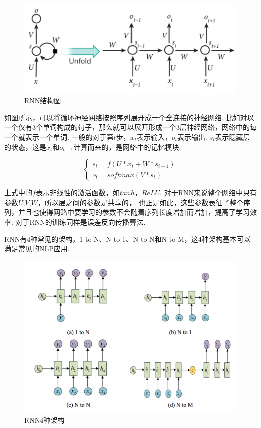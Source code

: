 \documentclass[bachelor,adobefonts]{jnuthesis}
\begin{document}
\begin{figure}[h!]
  \centering
  \includegraphics[width=0.6\linewidth]{RNN.png}
  \caption{RNN结构图}
\end{figure}

如图所示，可以将循环神经网络按照序列展开成一个全连接的神经网络.
比如对以一个仅有3个单词构成的句子，那么就可以展开形成一个3层神经网络，网络中的每一个就表示一个单词.
一般的对于第$t$步，$x_{t}$表示输入，$o_{t}$表示输出.
$s_{t}$表示隐藏层的状态，这是$x_{t}$和$o_{t-1}$计算而来的，是网络中的记忆模块.

\begin{equation}
  \left\{
  \begin{array}{l}
    s_{t} = f(U*x_{t}+W*s_{t-1}) \\
    o_{t} = softmax(V*s_{t})
  \end{array}
  \right.
\end{equation}

上式中的$f$表示非线性的激活函数，如$tanh$，$ReLU$.
对于RNN来说整个网络中只有参数$U$,$V$,$W$，所以层之间的参数是共享的，
也正是如此，这些参数表征了整个序列，并且也使得网路中要学习的参数不会随着序列长度增加而增加，提高了学习效率.
对于RNN的训练同样是误差反向传播算法.

RNN有4种常见的架构，1 to N、N to 1、N to N和N to M，这4种架构基本可以满足常见的NLP应用.

\begin{figure}[h!]
  \centering
  \includegraphics[width=0.65\linewidth]{4zhongjiagou.png}
  \caption{RNN4种架构}
\end{figure}
\end{document}
